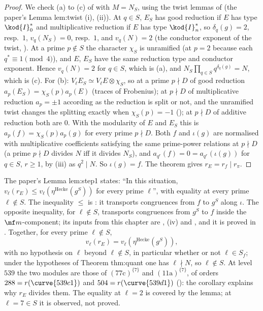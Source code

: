 \begin{proof}
We check (a) to (c) of  with $M=N_S$, using the twist lemmas of  (the paper's Lemma lem:twist (i), (ii)). At $q\in S$, $E_S$ has good
reduction if $E$ has type $\kod{I}_0^*$ and multiplicative reduction if $E$ has type $\kod{I}_n^*$, so $\delta_q(g)=2$, resp.\ $1$, $v_q(N_S)=0$, resp.\ $1$, and $v_q(N)=2$ (the conductor
exponent of the twist, ). At a prime $p\notin S$ the character $\chi_S$ is unramified (at $p=2$ because each $q^*\equiv1\pmod4$), and $E$, $E_S$ have the same reduction type
and conductor exponent. Hence $v_q(N)=2$ for $q\in S$, which is (a), and $N_S\prod_{q\in S}q^{\delta_q(g)}=N$, which is (c). For (b): $V_\ell E_S\simeq V_\ell E\otimes\chi_S$, so at a prime $p\nmid D$ of good
reduction $a_p(E_S)=\chi_S(p)a_p(E)$ (traces of Frobenius); at $p\nmid D$ of multiplicative reduction $a_p=\pm1$ according as the reduction is split or not, and the unramified twist changes the
splitting exactly when $\chi_S(p)=-1$ (); at $p\nmid D$ of additive reduction both are $0$. With the modularity of $E$ and $E_S$ this is $a_p(f)=\chi_S(p)a_p(g)$ for every
prime $p\nmid D$. Both $f$ and $\iota(g)$ are normalised with multiplicative coefficients satisfying the same prime-power relations at $p\nmid D$ (a prime $p\nmid D$ divides $N$ iff it divides
$N_S$), and $a_{q^r}(f)=0=a_{q^r}(\iota(g))$ for $q\in S$, $r\ge1$, by (iii) as $q^2\mid N$. So $\iota(g)=f$. The theorem gives $r_E=r_f\mid r_\pi$.
\end{proof}

\begin{remark}\label{rem:hecke:commentary-step1}
The paper's Lemma lem:step1 states: ``In this situation, $v_\ell(r_E)\le v_\ell(\eta^{\mathrm{Hecke}}(g^S))$ for every prime $\ell$'', with equality at every prime $\ell\notin S$.
The inequality $\le$ is : it transports congruences from $f$ to $g^S$ along $\iota$. The opposite inequality, for $\ell\notin S$, transports congruences from $g^S$ to $f$
inside the $\mf m$-component; its inputs from this chapter are , (iv) and , and it is proved
in . Together, for every prime $\ell\notin S$,
\[
v_\ell(r_E)=v_\ell(\eta^{\mathrm{Hecke}}(g^S)),
\]
with no hypothesis on $\ell$ beyond $\ell\notin S$, in particular whether or not $\ell\in S_f$; under the hypotheses of Theorem thm:quant one has $\ell\nmid N$, so $\ell\notin S$. At level $539$ the
two modules are those of $(\text{77c})^{\{7\}}$ and $(\text{11a})^{\{7\}}$, of orders $288=r(\curve{539c1})$ and $504=r(\curve{539d1})$ (): the corollary explains why
$r_E$ divides them. The equality at $\ell=2$ is covered by the lemma; at $\ell=7\in S$ it is observed, not proved.
\end{remark}

